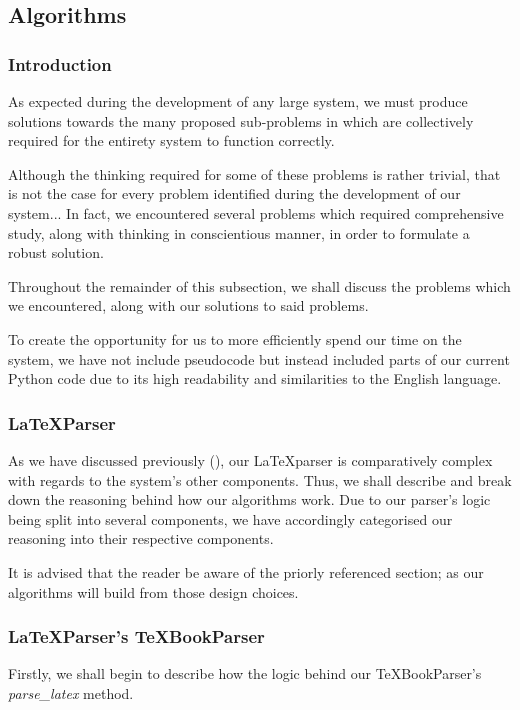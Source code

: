 \subsection*{Algorithms}
	\subsubsection*{Introduction}
		As expected during the development of any large system, we must produce solutions towards the many proposed sub-problems in which are collectively required for the entirety system to function correctly.
		
		Although the thinking required for some of these problems is rather trivial, that is not the case for every problem identified during the development of our system... In fact, we encountered several problems which required comprehensive study, along with thinking in conscientious manner, in order to formulate a robust solution.
		
		Throughout the remainder of this subsection, we shall discuss the problems which we encountered, along with our solutions to said problems.
		
		To create the opportunity for us to more efficiently spend our time on the system, we have not include pseudocode but instead included parts of our current Python code due to its high readability and similarities to the English language.
		
	\subsubsection*{\LaTeX Parser}
		As we have discussed previously (), our \LaTeX parser is comparatively complex with regards to the system's other components. Thus, we shall describe and break down the reasoning behind how our algorithms work. Due to our parser's logic being split into several components, we have accordingly categorised our reasoning into their respective components.
		
		It is advised that the reader be aware of the priorly referenced section; as our algorithms will build from those design choices.
		
	\subsubsection*{\LaTeX Parser's \TeX BookParser} \label{sssec:texbookparser}
		Firstly, we shall begin to describe how the logic behind our \TeX BookParser's \textit{parse\_latex} method.
		

